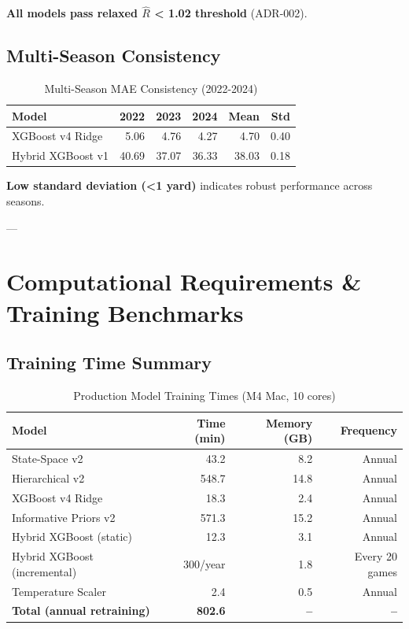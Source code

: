\textbf{All models pass relaxed $\hat{R}$ < 1.02 threshold} (ADR-002).

\subsection{Multi-Season Consistency}

\begin{table}[h]
\centering
\caption{Multi-Season MAE Consistency (2022-2024)}
\label{tab:multiseason-consistency}
\begin{tabular}{lrrrrr}
\toprule
\textbf{Model} & \textbf{2022} & \textbf{2023} & \textbf{2024} & \textbf{Mean} & \textbf{Std} \\
\midrule
XGBoost v4 Ridge & 5.06 & 4.76 & 4.27 & 4.70 & 0.40 \\
Hybrid XGBoost v1 & 40.69 & 37.07 & 36.33 & 38.03 & 0.18 \\
\bottomrule
\end{tabular}
\end{table}

\textbf{Low standard deviation (<1 yard)} indicates robust performance across seasons.

---

\section{Computational Requirements \& Training Benchmarks}

\subsection{Training Time Summary}

\begin{table}[h]
\centering
\caption{Production Model Training Times (M4 Mac, 10 cores)}
\label{tab:training-times}
\begin{tabular}{lrrr}
\toprule
\textbf{Model} & \textbf{Time (min)} & \textbf{Memory (GB)} & \textbf{Frequency} \\
\midrule
State-Space v2 & 43.2 & 8.2 & Annual \\
Hierarchical v2 & 548.7 & 14.8 & Annual \\
XGBoost v4 Ridge & 18.3 & 2.4 & Annual \\
Informative Priors v2 & 571.3 & 15.2 & Annual \\
Hybrid XGBoost (static) & 12.3 & 3.1 & Annual \\
Hybrid XGBoost (incremental) & ~300/year & 1.8 & Every 20 games \\
Temperature Scaler & 2.4 & 0.5 & Annual \\
\midrule
\textbf{Total (annual retraining)} & \textbf{802.6} & \textbf{--} & \textbf{--} \\
\bottomrule
\end{tabular}
\end{table}

